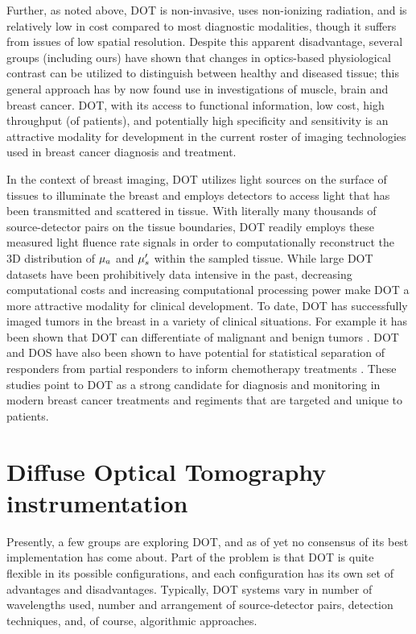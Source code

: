 Further, as noted above, DOT is non-invasive, uses non-ionizing radiation, and is relatively low in cost compared to most diagnostic modalities, though it suffers from issues of low spatial resolution. Despite this apparent disadvantage, several groups (including ours) have shown that changes in optics-based physiological contrast can be utilized to distinguish between healthy and diseased tissue; this general approach has by now found use in investigations of muscle\cite{Chance1988,Lin2002,Yu2005a,Yu2007}, brain \cite{Gratton1990,Benaron1994,Houten1996,Boas2002,Hebden2002,Culver2003b,Culver2003a,Hebden2003,Siegel2003,Xu2003,Boas2004,Durduran2004,Choe2005,Zhou2006,Franceschini2007,Kim2010,Roche-Labarbe2010} and breast cancer. DOT, with its access to functional information, low cost, high throughput (of patients), and potentially high specificity and sensitivity is an attractive modality for development in the current roster of imaging technologies used in breast cancer diagnosis and treatment.

In the context of breast imaging, DOT utilizes light sources on the surface of tissues to illuminate the breast and employs detectors to access light that has been transmitted and scattered in tissue. With literally many thousands of source-detector pairs on the tissue boundaries, DOT readily employs these measured light fluence rate signals in order to computationally reconstruct the 3D distribution of $\mu_a$ and $\mu_s^{\prime}$ within the sampled tissue. While large DOT datasets have been prohibitively data intensive in the past, decreasing computational costs and increasing computational processing power make DOT a more attractive modality for clinical development. To date, DOT has successfully imaged tumors in the breast in a variety of clinical situations. For example it has been shown that DOT can differentiate of malignant and benign tumors \cite{McBride1999,Pogue2001,Ntziachristos2002,Leff2008,Tromberg2008,Choe2009,Wang2010}. DOT and DOS have also been shown to have potential for statistical separation of responders from partial responders to inform chemotherapy treatments \cite{Tromberg2005,Zhu2008,Schegerin2009,Jiang2009,Cerussi2011,Choe2012,Busch2013}. These studies point to DOT as a strong candidate for diagnosis and monitoring in modern breast cancer treatments and regiments that are targeted and unique to patients.

%
\section{Diffuse Optical Tomography instrumentation}
Presently, a few groups are exploring DOT, and as of yet no consensus of its best implementation has come about. Part of the problem is that DOT is quite flexible in its possible configurations, and each configuration has its own set of advantages and disadvantages. Typically, DOT systems vary in number of wavelengths used, number and arrangement of source-detector pairs, detection techniques, and, of course, algorithmic approaches.

